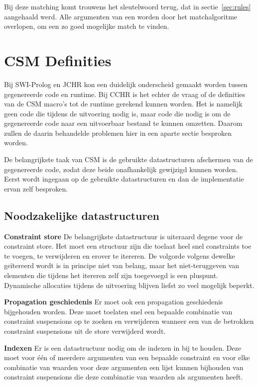 {Bij deze matching komt trouwens het sleutelwoord  terug, dat in sectie~\ref{sec:rules} aangehaald werd. Alle argumenten van een  worden door het matchalgoritme overlopen, om een zo goed mogelijke match te vinden.

\section{CSM Definities} \label{sec:csmdef}

Bij SWI-Prolog en JCHR kon een duidelijk onderscheid gemaakt worden tussen gegenereerde code en runtime. Bij CCHR is het echter de vraag of de definities van de CSM macro's tot de runtime gerekend kunnen worden. Het is namelijk geen code die tijdens de uitvoering nodig is, maar code die nodig is om de gegenereerde code naar een uitvoerbaar bestand te kunnen omzetten. Daarom zullen de daarin behandelde problemen hier in een aparte sectie besproken worden.

De belangrijkste taak van CSM is de gebruikte datastructuren afschermen van de gegenereerde code, zodat deze beide onafhankelijk gewijzigd kunnen worden. Eerst wordt ingegaan op de gebruikte datastructuren en dan de implementatie ervan zelf besproken.

\subsection{Noodzakelijke datastructuren} \label{sec:datastruct}

{\bf Constraint store} De belangrijkste datastructuur is uiteraard degene voor de constraint store. Het moet een structuur zijn die toelaat heel snel constraints toe te voegen, te verwijderen en erover te itereren. De volgorde volgens dewelke ge\"itereerd wordt is in principe niet van belang, maar het niet-teruggeven van elementen die tijdens het itereren zelf zijn toegevoegd is een pluspunt. Dynamische allocaties tijdens de uitvoering blijven liefst zo veel mogelijk beperkt.

{\bf Propagation geschiedenis} Er moet ook een propagation geschiedenis bijgehouden worden. Deze moet toelaten snel een bepaalde combinatie van constraint suspensions op te zoeken en verwijderen wanneer een van de betrokken constraint suspensions uit de store verwijderd wordt.

{\bf Indexen} Er is een datastructuur nodig om de indexen in bij te houden. Deze moet voor \'e\'en of meerdere argumenten van een bepaalde constraint en voor elke combinatie van waarden voor deze argumenten een lijst kunnen bijhouden van constraint suspensions die deze combinatie van waarden als argumenten heeft.
 
}
